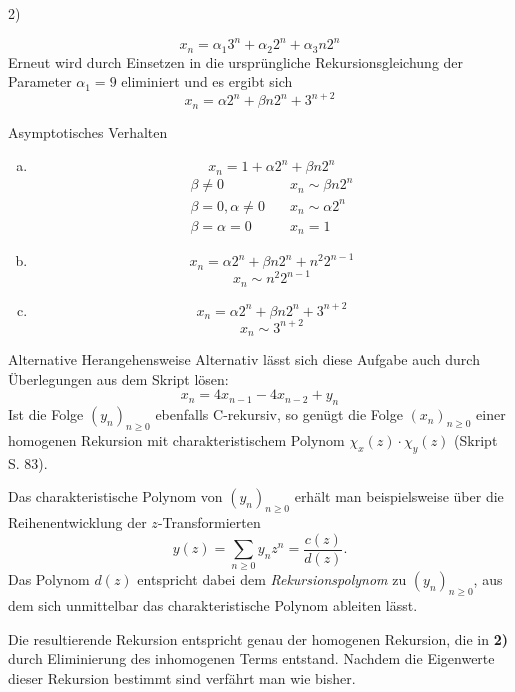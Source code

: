 \begin{paragraph}{2)}
\begin{enumerate}[(a)]
      \[ x_{n} = \alpha_{1}3^{n} + \alpha_{2}2^{n} + \alpha_{3}n2^{n} \]
      Erneut wird durch Einsetzen in die ursprüngliche Rekursionsgleichung der
      Parameter $\alpha_{1} = 9$ eliminiert und es ergibt sich
      \[ x_{n} = \alpha 2^{n} + \beta n2^{n} + 3^{n+2} \]
  \end{enumerate}
  \begin{subparagraph}{Asymptotisches Verhalten}
    \begin{enumerate}[(a)]
      \item \[ x_{n} = 1 + \alpha 2^{n} + \beta n2^{n} \]
        \begin{equation*}
          \begin{split}
           \beta \not= 0 &\quad x_{n} \sim \beta n2^{n} \\
           \beta = 0, \alpha \not= 0 &\quad x_{n} \sim \alpha 2^{n} \\
           \beta = \alpha = 0 & \quad x_{n} = 1
          \end{split}
        \end{equation*}
      \item \[ x_{n} = \alpha2^{n} + \beta n2^{n} + n^{2}2^{n-1}\]
        \[ x_{n} \sim n^{2}2^{n-1} \]
      \item \[ x_{n} = \alpha 2^{n} + \beta n2^{n} + 3^{n+2} \]
        \[ x_{n} \sim 3^{n+2} \]
    \end{enumerate}
  \end{subparagraph}
  \begin{subparagraph}{Alternative Herangehensweise}
	Alternativ lässt sich diese Aufgabe auch durch Überlegungen aus dem
	Skript lösen:
	\[ x_{n} = 4x_{n-1} - 4x_{n-2} + y_{n} \]
	Ist die Folge $(y_n)_{n\geq 0}$ ebenfalls C-rekursiv, so genügt die
	Folge $(x_n)_{n\geq 0}$ einer homogenen Rekursion mit
	charakteristischem Polynom $\chi_x(z)\cdot\chi_y(z)$ (Skript S. 83).

	Das charakteristische Polynom von $(y_n)_{n\geq 0}$ erhält man
	beispielsweise über die Reihenent\-wicklung der $z$-Transformierten
	\[ y(z) = \sum_{n\geq 0} y_n z^n = \frac{c(z)}{d(z)}. \]
	Das Polynom $d(z)$ entspricht dabei dem \textit{Rekursionspolynom} zu
	$(y_n)_{n\geq 0}$, aus dem sich unmittelbar das charakteristische
	Polynom ableiten lässt.

	Die resultierende Rekursion entspricht genau der homogenen Rekursion,
	die in \textbf{2)} durch Eliminierung des inhomogenen Terms entstand.
	Nachdem die Eigenwerte dieser Rekursion bestimmt sind verfährt man wie
	bisher.
  \end{subparagraph}
\end{paragraph}
